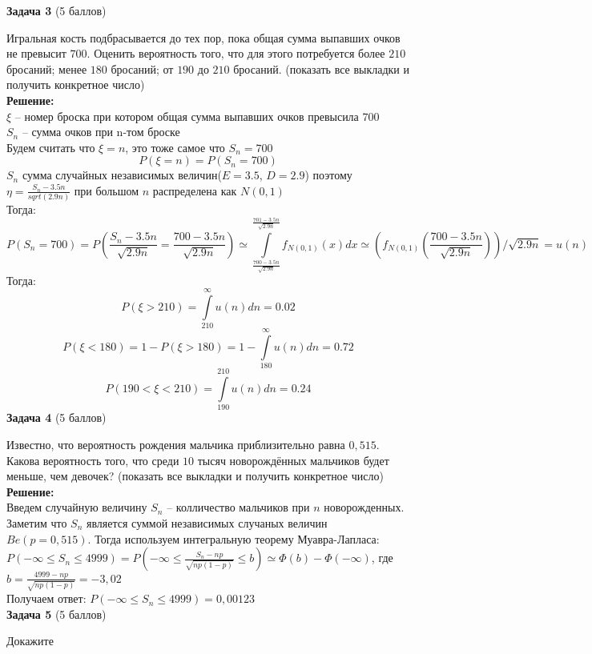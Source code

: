\documentclass{article}
\begin{document}
\textbf{Задача 3} (5 баллов)

Игральная кость подбрасывается до тех пор, пока общая сумма выпавших очков не превысит $700$. Оценить вероятность того, что для этого потребуется более $210$ бросаний; менее $180$ бросаний; от $190$ до $210$ бросаний. (показать все выкладки и получить конкретное число)\\

\textbf{Решение:}\\
$\xi$ -- номер броска при котором общая сумма выпавших очков превысила $700$\\
$S_n$ -- сумма очков при n-том броске\\ 
Будем считать что $\xi = n$, это тоже самое что $S_n = 700$\\
$$P(\xi = n) = P(S_n = 700)$$
$S_n$ сумма случайных независимых величин($E = 3.5$, $D = 2.9$) поэтому $\eta = \frac{S_n-3.5n}{sqrt(2.9n)}$ при большом $n$ распределена как $N(0,1)$\\
Тогда:
$$P(S_n = 700) = P(\frac{S_n-3.5n}{\sqrt{2.9n}} = \frac{700-3.5n}{\sqrt{2.9n}}) \simeq \int\limits_{\frac{700-3.5n}{\sqrt{2.9n}}}^{\frac{701-3.5n}{\sqrt{2.9n}}} f_{N(0,1)}(x)dx \simeq (f_{N(0,1)}(\frac{700-3.5n}{\sqrt{2.9n}}))/ \sqrt{2.9n} = u(n)$$
Тогда:
$$P(\xi>210) = \int\limits_{210}^{\infty} u(n) dn = 0.02$$
$$P(\xi<180) = 1 -P(\xi>180) = 1 - \int\limits_{180}^{\infty} u(n) dn = 0.72$$
$$P(190<\xi<210) = \int\limits_{190}^{210} u(n) dn = 0.24$$
\textbf{Задача 4} (5 баллов)

Известно, что вероятность рождения мальчика приблизительно равна $0,515$. Какова вероятность того, что среди $10$ тысяч новорождённых мальчиков будет меньше, чем девочек? (показать все выкладки и получить конкретное число)\\

\textbf{Решение:}\\
Введем случайную величину $S_n$ -- колличество мальчиков при $n$ новорожденных. Заметим что $S_n$ является суммой независимых случаных величин $Be(p = 0,515)$. Тогда используем интегральную теорему Муавра-Лапласа:\\
$P(-\infty \leq S_n \leq 4999)  = P(-\infty \leq \frac{S_n - np}{\sqrt{np(1-p)}} \leq b) \simeq \Phi(b) - \Phi(-\infty)$, где $b = \frac{4999 - np}{\sqrt{np(1-p)}} = -3,02$\\
Получаем ответ: $P(-\infty \leq S_n \leq 4999) = 0,00123$\\

\textbf{Задача 5} (5 баллов)

Докажите
\end{document}

